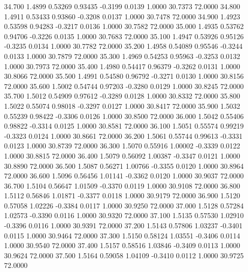   34.700   1.4899   0.53269   0.93435  -0.3199   0.0139   1.0000  30.7373  72.0000
  34.800   1.4911   0.53433   0.93860  -0.3208   0.0137   1.0000  30.7478  72.0000
  34.900   1.4923   0.53598   0.94283  -0.3217   0.0136   1.0000  30.7582  72.0000
  35.000   1.4935   0.53762   0.94706  -0.3226   0.0135   1.0000  30.7683  72.0000
  35.100   1.4947   0.53926   0.95126  -0.3235   0.0134   1.0000  30.7782  72.0000
  35.200   1.4958   0.54089   0.95546  -0.3244   0.0133   1.0000  30.7879  72.0000
  35.300   1.4969   0.54253   0.95963  -0.3253   0.0132   1.0000  30.7973  72.0000
  35.400   1.4980   0.54417   0.96379  -0.3262   0.0131   1.0000  30.8066  72.0000
  35.500   1.4991   0.54580   0.96792  -0.3271   0.0130   1.0000  30.8156  72.0000
  35.600   1.5002   0.54744   0.97203  -0.3280   0.0129   1.0000  30.8245  72.0000
  35.700   1.5012   0.54909   0.97612  -0.3289   0.0128   1.0000  30.8332  72.0000
  35.800   1.5022   0.55074   0.98018  -0.3297   0.0127   1.0000  30.8417  72.0000
  35.900   1.5032   0.55239   0.98422  -0.3306   0.0126   1.0000  30.8500  72.0000
  36.000   1.5042   0.55406   0.98822  -0.3314   0.0125   1.0000  30.8581  72.0000
  36.100   1.5051   0.55574   0.99219  -0.3323   0.0124   1.0000  30.8661  72.0000
  36.200   1.5061   0.55744   0.99613  -0.3331   0.0123   1.0000  30.8739  72.0000
  36.300   1.5070   0.55916   1.00002  -0.3339   0.0122   1.0000  30.8815  72.0000
  36.400   1.5079   0.56092   1.00387  -0.3347   0.0121   1.0000  30.8890  72.0000
  36.500   1.5087   0.56271   1.00766  -0.3355   0.0120   1.0000  30.8964  72.0000
  36.600   1.5096   0.56456   1.01141  -0.3362   0.0120   1.0000  30.9037  72.0000
  36.700   1.5104   0.56647   1.01509  -0.3370   0.0119   1.0000  30.9108  72.0000
  36.800   1.5112   0.56846   1.01871  -0.3377   0.0118   1.0000  30.9179  72.0000
  36.900   1.5120   0.57058   1.02226  -0.3384   0.0117   1.0000  30.9250  72.0000
  37.000   1.5128   0.57284   1.02573  -0.3390   0.0116   1.0000  30.9320  72.0000
  37.100   1.5135   0.57530   1.02910  -0.3396   0.0116   1.0000  30.9391  72.0000
  37.200   1.5143   0.57806   1.03237  -0.3401   0.0115   1.0000  30.9464  72.0000
  37.300   1.5150   0.58124   1.03551  -0.3406   0.0114   1.0000  30.9540  72.0000
  37.400   1.5157   0.58516   1.03846  -0.3409   0.0113   1.0000  30.9624  72.0000
  37.500   1.5164   0.59058   1.04109  -0.3410   0.0112   1.0000  30.9725  72.0000
